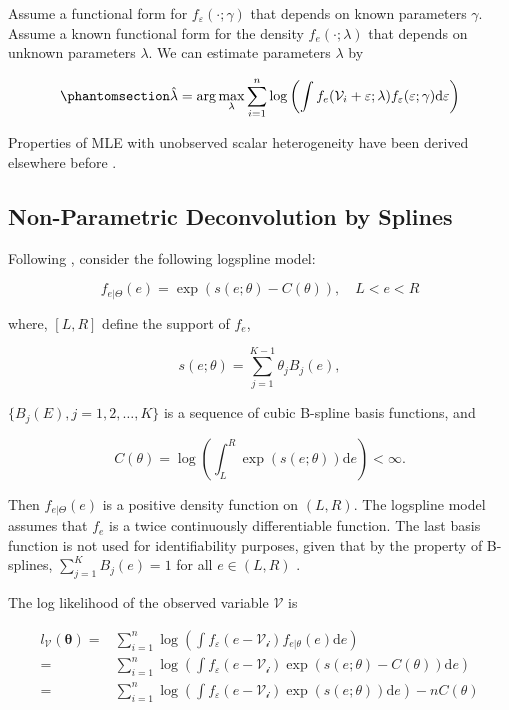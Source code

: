 \documentclass[
  12pt]{article}
\theoremstyle{definition}
\theoremstyle{remark}
\begin{document}
Assume a functional form for \(f_{\varepsilon}(\cdot;\gamma)\) that
depends on known parameters \(\gamma\). Assume a known functional form
for the density \(f_e(\cdot;\lambda)\) that depends on unknown
parameters \(\lambda\). We can estimate parameters \(\lambda\) by

\begin{equation}\phantomsection\label{eq-mle}{
\hat \lambda = \arg \max_{\lambda}\sum_{i=1}^n \log \left(\int f_e(\mathcal{V}_i+\varepsilon;\lambda)f_{\varepsilon}(\varepsilon;\gamma)\text{d}\varepsilon\right)
}\end{equation}

Properties of MLE with unobserved scalar heterogeneity have been derived
elsewhere before \citep{Chen2007, Yi2021}.

\subsection{Non-Parametric Deconvolution by
Splines}\label{non-parametric-deconvolution-by-splines}

Following \citet{Kang2021}, consider the following logspline model:

\[
f_{e|\Theta}(e)=\exp(s(e;\theta)-C(\theta)), \quad L < e < R
\]

where, \([L,R]\) define the support of \(f_e\),

\[
s(e;\theta)=\sum_{j=1}^{K-1}\theta_j B_j(e),
\]

\(\{B_j(E), j=1,2,\dots, K\}\) is a sequence of cubic B-spline basis
functions, and

\[
C(\theta) = \log\left(\int^R_L \exp(s(e;\theta)) \text{d}e \right) < \infty .
\]

Then \(f_{e|\Theta}(e)\) is a positive density function on \((L,R)\).
The logspline model assumes that \(f_e\) is a twice continuously
differentiable function. The last basis function is not used for
identifiability purposes, given that by the property of B-splines,
\(\sum_{j=1}^{K}B_j(e)=1\) for all \(e \in (L,R)\) .

The log likelihood of the observed variable \(\mathcal{V}\) is

\[
\begin{aligned}
    l_{\mathcal{V}}(\mathbf{\theta})=&\sum_{i=1}^{n}\log \left(\int f_{\varepsilon}(e-\mathcal{V_i})f_{e|\theta}(e)\text{d}e\right)\\
    =&\sum_{i=1}^{n}\log \left(\int f_{\varepsilon}(e-\mathcal{V_i})\exp(s(e;\theta)-C(\theta))\text{d}e\right)\\
    =&\sum_{i=1}^{n}\log \left(\int f_{\varepsilon}(e-\mathcal{V_i})\exp(s(e;\theta))\text{d}e\right)-nC(\theta)
\end{aligned}
\]
\end{document}
